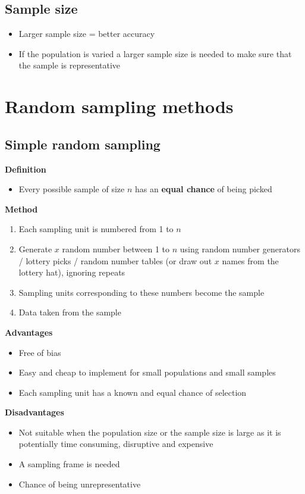 \subsection{Sample size}
\begin{itemize}
	\item Larger sample size = better accuracy
	\item If the population is varied a larger sample size is needed to make sure that the sample is representative
\end{itemize}


\section{Random sampling methods}
\subsection{Simple random sampling}
\textbf{Definition}
\begin{itemize}
	\item Every possible sample of size $n$ has an \textbf{equal chance} of being picked
\end{itemize}
\textbf{Method}
\begin{enumerate}
	\item Each sampling unit is numbered from 1 to $n$
	\item Generate $x$ random number between 1 to $n$ using random number generators / lottery picks / random number tables (or draw out $x$ names from the lottery hat), ignoring repeats
	\item Sampling units corresponding to these numbers become the sample
	\item Data taken from the sample
\end{enumerate}
\textbf{Advantages}
\begin{itemize}
	\item Free of bias
	\item Easy and cheap to implement for small populations and small samples
	\item Each sampling unit has a known and equal chance of selection
\end{itemize}
\textbf{Disadvantages}
\begin{itemize}
	\item Not suitable when the population size or the sample size is large as it is potentially time consuming, disruptive and expensive
	\item A sampling frame is needed
	\item Chance of being unrepresentative
\end{itemize}
